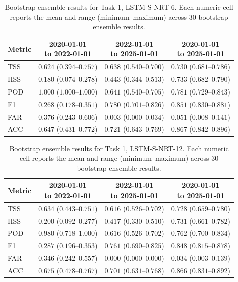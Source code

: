 \begin{table}[htbp]
\centering
\small
\caption{Bootstrap ensemble results for Task 1, LSTM-S-NRT-6. Each numeric cell reports the mean and range (minimum--maximum) across 30 bootstrap ensemble results.}
\label{tab:app-task1-lstm-s-nrt-6}
\begin{tabular}{lccc}
\toprule
Metric & \shortstack{2020-01-01\\to 2022-01-01} & \shortstack{2022-01-01\\to 2025-01-01} & \shortstack{2020-01-01\\to 2025-01-01} \\
\midrule
TSS & $0.624$ ($0.394$--$0.757$) & $0.638$ ($0.540$--$0.700$) & $0.730$ ($0.681$--$0.786$) \\
HSS & $0.180$ ($0.074$--$0.278$) & $0.443$ ($0.344$--$0.513$) & $0.733$ ($0.682$--$0.790$) \\
POD & $1.000$ ($1.000$--$1.000$) & $0.641$ ($0.540$--$0.705$) & $0.781$ ($0.729$--$0.843$) \\
F1 & $0.268$ ($0.178$--$0.351$) & $0.780$ ($0.701$--$0.826$) & $0.851$ ($0.830$--$0.881$) \\
FAR & $0.376$ ($0.243$--$0.606$) & $0.003$ ($0.000$--$0.034$) & $0.051$ ($0.008$--$0.141$) \\
ACC & $0.647$ ($0.431$--$0.772$) & $0.721$ ($0.643$--$0.769$) & $0.867$ ($0.842$--$0.896$) \\
\bottomrule
\end{tabular}
\end{table}
\clearpage

\begin{table}[htbp]
\centering
\small
\caption{Bootstrap ensemble results for Task 1, LSTM-S-NRT-12. Each numeric cell reports the mean and range (minimum--maximum) across 30 bootstrap ensemble results.}
\label{tab:app-task1-lstm-s-nrt-12}
\begin{tabular}{lccc}
\toprule
Metric & \shortstack{2020-01-01\\to 2022-01-01} & \shortstack{2022-01-01\\to 2025-01-01} & \shortstack{2020-01-01\\to 2025-01-01} \\
\midrule
TSS & $0.634$ ($0.443$--$0.751$) & $0.616$ ($0.526$--$0.702$) & $0.728$ ($0.659$--$0.780$) \\
HSS & $0.200$ ($0.092$--$0.277$) & $0.417$ ($0.330$--$0.510$) & $0.731$ ($0.661$--$0.782$) \\
POD & $0.980$ ($0.718$--$1.000$) & $0.616$ ($0.526$--$0.702$) & $0.762$ ($0.700$--$0.834$) \\
F1 & $0.287$ ($0.196$--$0.353$) & $0.761$ ($0.690$--$0.825$) & $0.848$ ($0.815$--$0.878$) \\
FAR & $0.346$ ($0.242$--$0.557$) & $0.000$ ($0.000$--$0.000$) & $0.034$ ($0.003$--$0.139$) \\
ACC & $0.675$ ($0.478$--$0.767$) & $0.701$ ($0.631$--$0.768$) & $0.866$ ($0.831$--$0.892$) \\
\bottomrule
\end{tabular}
\end{table}
\clearpage

